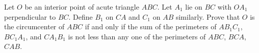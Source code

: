 Let $O$ be an interior point of acute triangle $ABC$. Let $A_1$ lie on $BC$ with $OA_1$ perpendicular to $BC$. Define $B_1$ on $CA$ and $C_1$ on $AB$ similarly. Prove that $O$ is the circumcenter of $ABC$ if and only if the sum of the perimeters of $AB_1C_1$, $BC_1A_1$, and $CA_1B_1$ is not less than any one of the perimeters of $ABC$, $BCA$, $CAB$.

